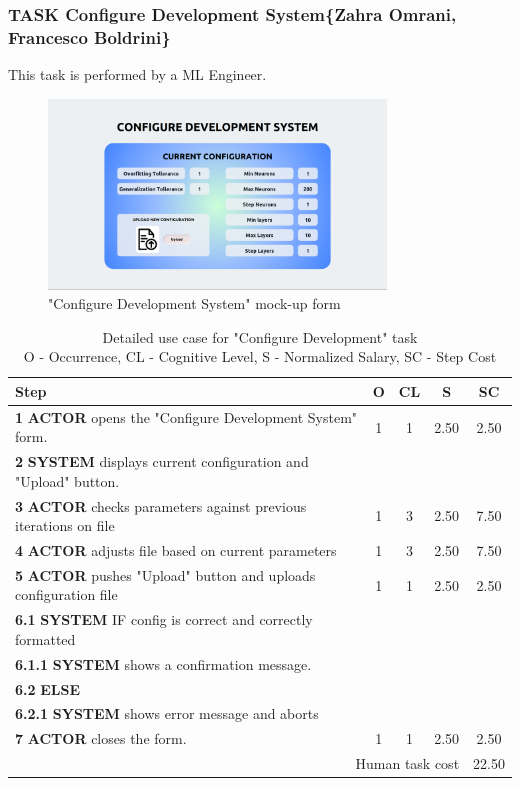 \subsubsection{TASK Configure Development System\{Zahra Omrani, Francesco Boldrini\}}
This task is performed by a ML Engineer.

\begin{figure}[H]
\centering
\includegraphics[width=0.8\textwidth]{figures/ui_configure_development.png}
\caption{"Configure Development System" mock-up form}
\end{figure}

\begin{table}[H]
\centering
\begin{tabularx}{\textwidth}{|X|c|c|c|c|}
\hline
\textbf{Step} & \textbf{O} & \textbf{CL} & \textbf{S} & \textbf{SC} \\
\hline
\textbf{1} \textbf{ACTOR} opens the "Configure Development System" form. & 1 & 1 & 2.50 & 2.50 \\
\hline
\textbf{2} \textbf{SYSTEM} displays current configuration and "Upload" button. & & & & \\
\hline
\textbf{3} \textbf{ACTOR} checks parameters against previous iterations on file & 1 & 3 & 2.50 & 7.50 \\
\hline
\textbf{4} \textbf{ACTOR} adjusts file based on current parameters & 1 & 3 & 2.50 & 7.50 \\
\hline
\textbf{5} \textbf{ACTOR} pushes "Upload" button and uploads configuration file & 1 & 1 & 2.50 & 2.50 \\
\hline
\textbf{6.1} \textbf{SYSTEM} IF config is correct and correctly formatted & & & & \\
\hline
\textbf{6.1.1} \textbf{SYSTEM} shows a confirmation message. & & & & \\
\hline
\textbf{6.2} \textbf{ELSE} & & & & \\
\hline
\textbf{6.2.1} \textbf{SYSTEM} shows error message and aborts & & & & \\
\hline
\textbf{7} \textbf{ACTOR} closes the form. & 1 & 1 & 2.50 & 2.50 \\
\hline
\multicolumn{4}{|r|}{Human task cost} & 22.50 \\
\hline
\end{tabularx}
\caption{Detailed use case for "Configure Development" task\\ 
O - Occurrence, CL - Cognitive Level, S - Normalized Salary, SC - Step Cost}
\label{table:configure_development_system}
\end{table}
